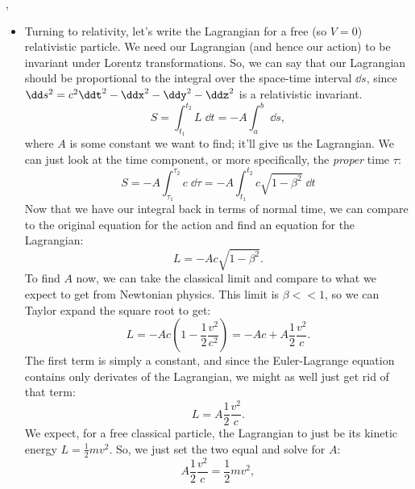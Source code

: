 \sep




\begin{itemize}
    \item Turning to relativity, let's write the Lagrangian for a free (so $V=0$) relativistic particle. We need our Lagrangian (and hence our action) to be invariant under Lorentz transformations. So, we can say that our Lagrangian should be proportional to the integral over the space-time interval $\dd s$, since $\dd s^2 = c^2\ddt^2 - \ddx^2 - \ddy^2 - \ddz^2$ is a relativistic invariant.
        \begin{equation*}
            S = \int_{t_1}^{t_2} L \;\dd t = -A \int_a^b \;\dd s,
        \end{equation*}
        where $A$ is some constant we want to find; it'll give us the Lagrangian. We can just look at the time component, or more specifically, the \textit{proper} time $\tau$:
        \begin{equation*}
            S = -A\int_{\tau_1}^{\tau_2} c \;\dd\tau = -A\int_{t_1}^{t_2} c\sqrt{1-\beta^2} \;\dd t
        \end{equation*}
        Now that we have our integral back in terms of normal time, we can compare to the original equation for the action and find an equation for the Lagrangian:
        \begin{equation*}
            L = -Ac\sqrt{1-\beta^2}.
        \end{equation*}
        To find $A$ now, we can take the classical limit and compare to what we expect to get from Newtonian physics. This limit is $\beta << 1$, so we can Taylor expand the square root to get:
        \begin{equation*}
            L = -Ac \left(1 - \frac{1}{2}\frac{v^2}{c^2}\right) = -Ac + A\frac{1}{2}\frac{v^2}{c}.
        \end{equation*}
        The first term is simply a constant, and since the Euler-Lagrange equation contains only derivates of the Lagrangian, we might as well just get rid of that term:
        \begin{equation*}
            L = A\frac{1}{2}\frac{v^2}{c}.
        \end{equation*}
        We expect, for a free classical particle, the Lagrangian to just be its kinetic energy $L = \frac{1}{2}mv^2$. So, we just set the two equal and solve for $A$:
        \begin{equation*}
            A\frac{1}{2}\frac{v^2}{c} = \frac{1}{2}mv^2,
        \end{equation*}

\end{itemize}
